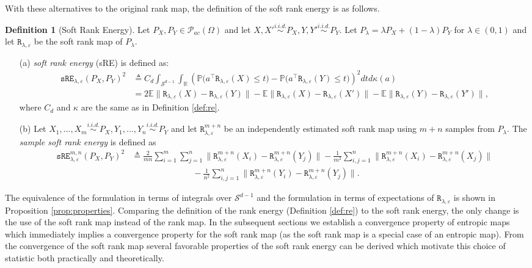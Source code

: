 \documentclass{article}
\theoremstyle{definition}
\newtheorem{definition}{Definition}
\newcommand{\sR}{\mathtt{R}_{\lambda,\varepsilon}}
\newcommand{\sRn}{\mathtt{R}_{\lambda,\varepsilon}^{m+n}}
\newcommand{\sRE}{\mathtt{sRE}_{\lambda,\varepsilon}}
\newcommand{\sREn}{\mathtt{sRE}_{\lambda, \varepsilon}^{m,n}}
\begin{document}
With these alternatives to the original rank map, the definition of the soft rank energy is as follows.
\begin{definition}[Soft Rank Energy]\label{def:sre}
Let $P_X,P_Y \in \mathcal{P}_{ac}(\Omega)$ and let $X,X' \overset{i.i.d.}{\sim} P_X, Y,Y' \overset{i.i.d.}{\sim} P_Y$.  Let $P_\lambda = \lambda P_X +(1-\lambda) P_Y$ for  $\lambda\in (0,1)$ and let $\sR$ be the soft rank map of $P_\lambda$. 
\begin{enumerate}
\item[(a)] \textit{soft rank energy} (sRE) is defined as:
    \begin{align}\label{eq:sre}
        \sRE(P_X,P_Y)^2 &\triangleq C_d \int_{\mathcal S^{d-1}}\int_{\mathbb R} \left (\mathbb P\big(a^\top \sR(X)\leq t\big) - \mathbb P\big(a^\top \sR(Y)\leq t) \right )^2 dt  d\kappa(a) \\
        &= 2\mathbb E\big\|\sR(X)-\sR(Y)\big\|- \mathbb E\big\|\sR(X)-\sR(X')\big\| - \mathbb E\big\|\sR(Y)-\sR(Y')\big\|,\nonumber
    \end{align}
    where $C_d$ and $\kappa$ are the same as in Definition \ref{def:re}. 
    \item[(b)] Let $X_1,...,X_m \overset{i.i.d.}{\sim} P_X, Y_1,...,Y_n \overset{i.i.d.}{\sim} P_Y$ and let $\sRn$ be an independently estimated soft rank map using $m+n$ samples from $P_\lambda$. The \emph{sample soft rank energy} is defined as
    \begin{align}
        \sREn(P_X,P_Y)^2 &\triangleq \frac{2}{mn} \sum_{i=1}^m\sum_{j=1}^n \| \sRn(X_i) - \sRn(Y_j)  \| - \frac{1}{m^2} \sum_{i,j=1}^n \| \sRn(X_i) - \sRn(X_j)  \| \nonumber \\
        & \hspace{3cm} - \frac{1}{n^2} \sum_{i,j=1}^n \| \sRn(Y_i) - \sRn(Y_j)  \|.  \label{eq:sample_sRE}
    \end{align}
\end{enumerate}
\end{definition}
The equivalence of the formulation in terms of integrals over $\mathcal{S}^{d-1}$ and the formulation in terms of expectations of $\sR$ is shown in Proposition \ref{prop:properties}.
Comparing the definition of the rank energy (Definition \ref{def:re}) to the soft rank energy, the only change is the use of the soft rank map instead of the rank map. In the subsequent sections we establish a convergence property of entropic maps which immediately implies a convergence property for the soft rank map (as the soft rank map is a special case of an entropic map). From the convergence of the soft rank map several favorable properties of the soft rank energy can be derived which motivate this choice of statistic both practically and theoretically.
\end{document}
